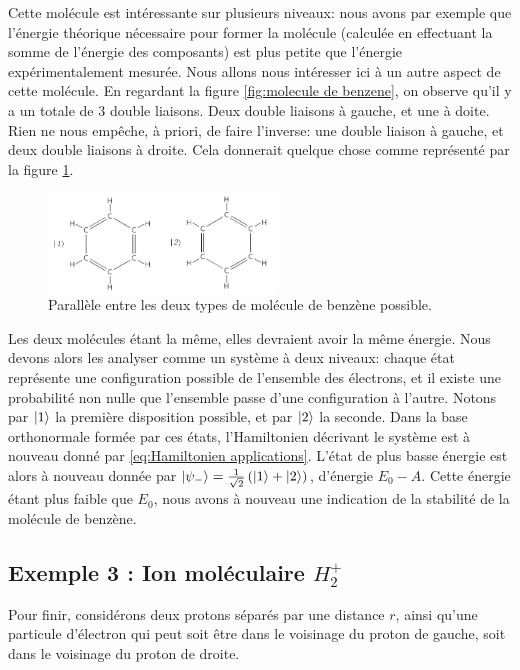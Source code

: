 \documentclass[../notesdecours.tex]{subfiles}
\begin{document}
Cette molécule est intéressante sur plusieurs niveaux: nous avons par exemple que l'énergie théorique nécessaire pour former la molécule (calculée en effectuant la somme de l'énergie des composants) est plus petite que l'énergie expérimentalement mesurée. Nous allons nous intéresser ici à un autre aspect de cette molécule. En regardant la figure \ref{fig:molecule de benzene}, on observe qu'il y a un totale de 3 double liaisons. Deux double liaisons à gauche, et une à doite. Rien ne nous empêche, à priori, de faire l'inverse: une double liaison à gauche, et deux double liaisons à droite. Cela donnerait quelque chose comme représenté par la figure \ref{fig:symmetrie benzene}.

\begin{figure}[h]
    \centering
    \includegraphics[width=6cm,scale=0.5]{Chapitre 5/Figure 4.jpg}
    \caption{Parallèle entre les deux types de molécule de benzène possible.}
    \label{fig:symmetrie benzene}
\end{figure}

Les deux molécules étant la même, elles devraient avoir la même énergie. Nous devons alors les analyser comme un système à deux  niveaux: chaque état représente une configuration possible de l'ensemble des électrons, et il existe une probabilité non nulle que l'ensemble passe d'une configuration à l'autre. \color{black}Notons par $\ket{1}$ la première disposition possible, et par $\ket{2}$ la seconde. Dans la base orthonormale formée par ces états, l'Hamiltonien décrivant le système est à nouveau donné par \eqref{eq:Hamiltonien applications}. L'état de plus basse énergie est alors à nouveau donnée par $\ket{\psi_-} = \frac{1}{\sqrt{2}}\left(\ket{1}+\ket{2}\right)$, d'énergie $E_0-A$. Cette énergie étant plus faible que $E_0$, nous avons à nouveau une indication de la stabilité de la molécule de benzène.

\subsection*{Exemple 3 : Ion moléculaire $H_2^+$}

Pour finir, considérons deux protons séparés par une distance $r$, ainsi qu'une particule d'électron qui peut soit être dans le voisinage du proton de gauche, soit dans le voisinage du proton de droite.\\
\end{document}
